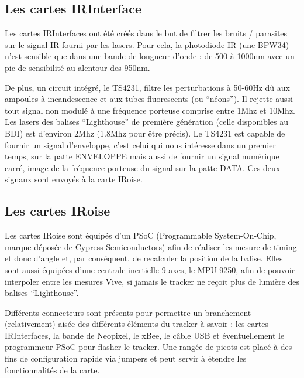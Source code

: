 \subsection{Les cartes IRInterface}

Les cartes IRInterfaces ont été créés dans le but de filtrer les bruits / parasites sur le signal IR fourni par les lasers. Pour cela, la photodiode IR (une BPW34) n'est sensible que dans une bande de longueur d'onde : de 500 à 1000nm avec un pic de sensibilité au alentour des 950nm.

De plus, un circuit intégré, le TS4231, filtre les perturbations à 50-60Hz dû aux ampoules à incandescence et aux tubes fluorescents (ou "`néons"'). Il rejette aussi tout signal non modulé à une fréquence porteuse comprise entre 1Mhz et 10Mhz. Les lasers des balises "`Lighthouse"' de première génération (celle disponibles au BDI) est d'environ 2Mhz (1.8Mhz pour être précis). Le TS4231 est capable de fournir un signal d'enveloppe, c'est celui qui nous intéresse dans un premier temps, sur la patte ENVELOPPE mais aussi de fournir un signal numérique carré, image de la fréquence porteuse du signal sur la patte DATA. Ces deux signaux sont envoyés à la carte IRoise.


\subsection{Les cartes IRoise}

Les cartes IRoise sont équipés d'un PSoC (Programmable System-On-Chip, marque déposée de Cypress Semiconductors) afin de réaliser les mesure de timing et donc d'angle et, par conséquent, de recalculer la position de la balise. Elles sont aussi équipées d'une centrale inertielle 9 axes, le MPU-9250, afin de pouvoir interpoler entre les mesures Vive, si jamais le tracker ne reçoit plus de lumière des balises "`Lighthouse"'.

Différents connecteurs sont présents pour permettre un branchement (relativement) aisée des différents éléments du tracker à savoir : les cartes IRInterfaces, la bande de Neopixel, le xBee, le câble USB et éventuellement le programmeur PSoC pour flasher le tracker. Une rangée de picots est placé à des fins de configuration rapide via jumpers et peut servir à étendre les fonctionnalités de la carte.


